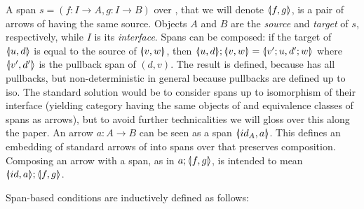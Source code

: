 A span $s = (f: I \to A, g:I \to B)$ over , that we will denote $\spanof f g$, is a pair of arrows of  having the same source. Objects $A$ and $B$ are the \emph{source} and \emph{target} of $s$, respectively, while $I$ is its \emph{interface}. Spans can be composed: if the target of $\spanof u d$ is equal to the source of $\spanof v w$, then $\spanof u d;\spanof v w=\spanof{v';u}{d';w}$ where $\spanof {v'}{d'}$ is the pullback span of $(d,v)$. The result is defined, because  has all pullbacks, but non-deterministic in general because pullbacks are defined up to iso. The standard solution would be to consider spans up to isomorphism of their interface (yielding category \SpanC having the same objects of  and equivalence classes of spans as arrows), but to avoid further technicalities we will gloss over this along the paper.
An arrow $a:A \to B$ can be seen as a span $\spanof{id_A}{a}$. This defines an embedding of standard arrows of  into spans over  that preserves composition. Composing an arrow with a span, as in $a ; \spanof f g$, is intended to mean $\spanof{id}{a}  ; \spanof f g$.

Span-based conditions are inductively defined as follows:

